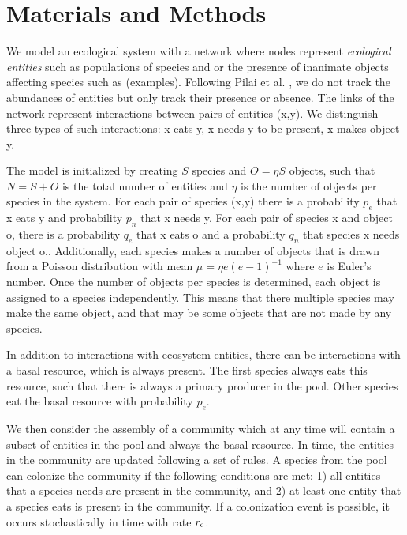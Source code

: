 \documentclass[9pt,twocolumn,twoside]{pnas-new}
\newcommand{\rr}[1]{{\rm #1}}
\begin{document}

\section*{Materials and Methods}
  \footnotesize{
  We model an ecological system with a network where nodes represent \emph{ecological entities} such as populations of species and or the presence of inanimate objects affecting species such as (examples).
  Following Pilai et al. \cite{Pillai2011}, we do not track the abundances of entities but only track their presence or absence.
  The links of the network represent interactions between pairs of entities (x,y).
  We distinguish three types of such interactions: x eats y, x needs y to be present, x makes object y.


  The model is initialized by creating $S$ species and $O = \eta S$ objects, such that $N=S+O$ is the total number of entities and $\eta$ is the number of objects per species in the system.
  For each pair of species (x,y) there is a probability $p_e$ that x eats y and probability $p_n$ that x needs y.
  For each pair of species x and object o, there is a probability $q_e$ that x eats o and a probability $q_n$ that species x needs object o..
  Additionally, each species makes a number of objects that is drawn from a Poisson distribution with mean $\mu = \eta e(e-1)^{-1}$ where $e$ is Euler's number.
  Once the number of objects per species is determined, each object is assigned to a species independently.
  This means that there multiple species may make the same object, and that may be some objects that are not made by any species.

  In addition to interactions with ecosystem entities, there can be interactions with a basal resource, which is always present.
  The first species always eats this resource, such that there is always a primary producer in the pool.
  Other species eat the basal resource with probability $p_e$.

  We then consider the assembly of a community which at any time will contain a subset of entities in the pool and always the basal resource.
  In time, the entities in the community are updated following a set of rules.
  A species from the pool can colonize the community if the following conditions are met:
  1) all entities that a species needs are present in the community, and
  2) at least one entity that a species eats is present in the community.
  If a colonization event is possible, it occurs stochastically in time with rate $r_\rr{c}$.

}
\end{document}
